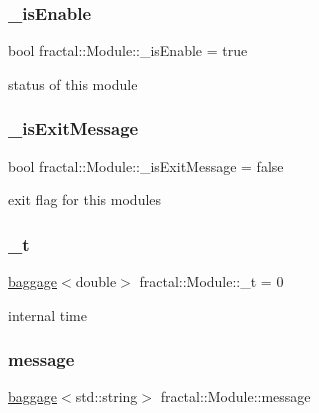 \mbox{\label{classfractal_1_1Module_ac1194f7c1723026348f7dc2df099ccf6}} 
\subsubsection{\texorpdfstring{\+\_\+is\+Enable}{\_isEnable}}
{\footnotesize\ttfamily bool fractal\+::\+Module\+::\+\_\+is\+Enable = true\hspace{0.3cm}{\ttfamily [protected]}}



status of this module 

\mbox{\label{classfractal_1_1Module_a3c0219468a7d043c70420cca57f39989}} 
\subsubsection{\texorpdfstring{\+\_\+is\+Exit\+Message}{\_isExitMessage}}
{\footnotesize\ttfamily bool fractal\+::\+Module\+::\+\_\+is\+Exit\+Message = false\hspace{0.3cm}{\ttfamily [protected]}}



exit flag for this modules 

\mbox{\label{classfractal_1_1Module_a36d598812541ddb73bb733dbcd708974}} 
\subsubsection{\texorpdfstring{\+\_\+t}{\_t}}
{\footnotesize\ttfamily \hyperlink{classfractal_1_1baggage}{baggage}$<$double$>$ fractal\+::\+Module\+::\+\_\+t = 0\hspace{0.3cm}{\ttfamily [private]}}



internal time 

\mbox{\label{classfractal_1_1Module_a8e59ac0be2426bde4e79a589ffc4cce4}} 
\subsubsection{\texorpdfstring{message}{message}}
{\footnotesize\ttfamily \hyperlink{classfractal_1_1baggage}{baggage}$<$std\+::string$>$ fractal\+::\+Module\+::message}



